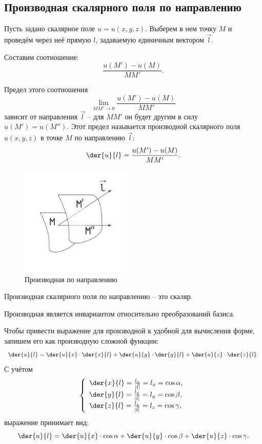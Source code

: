 \subsection{Производная скалярного поля по направлению}

    Пусть задано скалярное поле \( u = u(x,y,z) \). Выберем в нем точку \( M \) и проведём через неё прямую \( l \), задаваемую единичным вектором \( \vec{l} \).

    Составим соотношение:
    \[ \frac{u(M')-u(M)}{MM'}. \]

    Предел этого соотношения
    \[ \lim_{MM'\rightarrow0}\frac{u(M')-u(M)}{MM'} \]
    зависит от направления \( \vec{l} \) -- для \( MM' \) он будет другим в силу \( u(M') = u(M'') \). Этот предел называется производной скалярного поля \( u(x,y,z) \) в точке \( M \) по направлению \( \vec{l} \):
    \[ \der{u}{l} = \frac{u(M')-u(M)}{MM'}. \]
    
    \begin{figure}[h]
        \center
        \includegraphics[width=0.47\textwidth]{lec02/derivation_by_direction.pdf}
        \caption{Производная по направлению}
    \end{figure}

    \begin{remark}
        Производная скалярного поля по направлению -- это скаляр.
    \end{remark}

    \begin{remark}
        Производная является инвариантом относительно преобразований базиса.
    \end{remark}

    Чтобы привести выражение для производной к удобной для вычисления форме, запишем его как производную сложной функции:
	\begin{equation}
	\der{u}{l} = \der{u}{x}\cdot\der{x}{l} + \der{u}{y}\cdot\der{y}{l} + \der{u}{z}\cdot\der{z}{l}.
	\label{eq:2.1}
	\end{equation}
    С учётом
    \[ \left\{ \begin{array}{l}
                \der{x}{l} = \frac{l_x}{|\vec{l}|} = l_x = \cos\alpha, \\
                \der{y}{l} = \frac{l_y}{|\vec{l}|} = l_y = \cos\beta, \\
                \der{z}{l} = \frac{l_z}{|\vec{l}|} = l_z = \cos\gamma, \\
            \end{array} \right. \]
    выражение принимает вид:
    \[ \der{u}{l} = \der{u}{x}\cdot\cos\alpha + \der{u}{y}\cdot\cos\beta + \der{u}{z}\cdot\cos\gamma. \]


